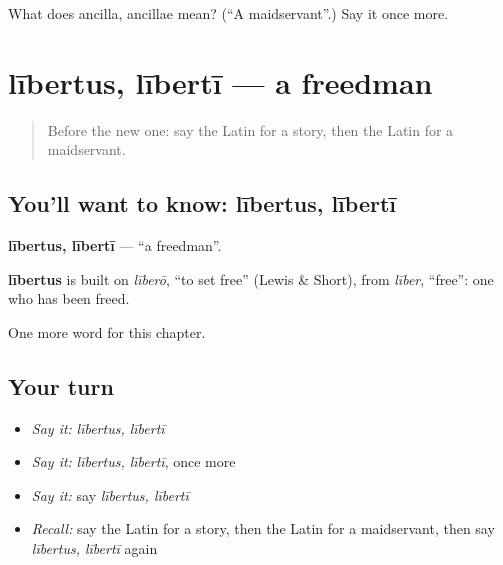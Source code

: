 \begin{tcolorbox}[breakable,colback=teal!4,colframe=teal!35!black,title={Before you move on}]
What does ancilla, ancillae mean? (\textquotedblleft{}A maidservant\textquotedblright{}.) Say it once more.
\end{tcolorbox}
\section[lībertus, lībertī]{lībertus, lībertī — a freedman}

\label{lesson:LA-C220-libertus}



\begin{quote}
Before the new one: say the Latin for a story, then the Latin for a maidservant.
\end{quote}

\subsection*{You'll want to know: lībertus, lībertī}
\textbf{lībertus, lībertī} — \textquotedblleft{}a freedman\textquotedblright{}.

\begin{cousinweb}
\textbf{lībertus} is built on \emph{līberō}, \textquotedblleft{}to set free\textquotedblright{} (Lewis \& Short), from \emph{līber}, \textquotedblleft{}free\textquotedblright{}: one who has been freed.
\end{cousinweb}

\begin{grammarlens}[title={What you've built}]
One more word for this chapter.
\end{grammarlens}

\subsection*{Your turn}
\begin{itemize}
\raggedright
  \item \emph{Say it:} \emph{lībertus, lībertī}
  \item \emph{Say it:} \emph{lībertus, lībertī}, once more
  \item \emph{Say it:} say \emph{lībertus, lībertī}
  \item \emph{Recall:} say the Latin for a story, then the Latin for a maidservant, then say \emph{lībertus, lībertī} again
\end{itemize}

